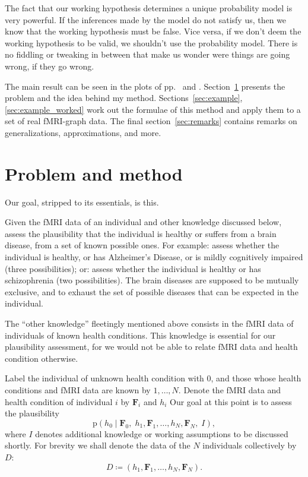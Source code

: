 \documentclass[\ifafour a4paper,12pt,\else a5paper,10pt,\fi%
onecolumn,oneside,article,%
british%
]{memoir}
\theoremstyle{remark}
\theoremstyle{innote}
\newcommand*{\defd}{\coloneqq}
\newcommand*{\pf}{\mathrm{p}}%
\renewcommand*{\|}{\mathpunct{|}}
\newcommand*{\yH}{h}
\newcommand*{\yD}{D}
\newcommand*{\yF}{\bm{F}}
\newcommand*{\yI}{I}
\theoremstyle{plain}
\begin{document}
The fact that our working hypothesis determines a unique probability model
is very powerful. If the inferences made by the model do not satisfy us,
then we know that the working hypothesis must be false. Vice versa, if we
don't deem the working hypothesis to be valid, we shouldn't use the
probability model. There is no fiddling or tweaking in between that make us
wonder were things are going wrong, if they go wrong.


The main result can be seen in the
plots of pp.~\pageref{results_regions} and
\pageref{results_regions_old}. Section~\ref{sec:problem} presents the
problem and the idea behind my method. Sections~\ref{sec:example},
\ref{sec:example_worked} work out the formulae of this method and apply
them to a set of real fMRI-graph data. The final section~\ref{sec:remarks}
contains remarks on generalizations, approximations, and more.

\section{Problem and method}
\label{sec:problem}

Our goal, stripped to its essentials, is this.

Given the fMRI data of an individual and other knowledge discussed below,
assess the plausibility that the individual is healthy or suffers from a
brain disease, from a set of known possible ones. For example: assess
whether the individual is healthy, or has Alzheimer's Disease, or is mildly
cognitively impaired (three possibilities); or: assess whether the
individual is healthy or has schizophrenia (two possibilities). The brain
diseases are supposed to be mutually exclusive, and to exhaust the set of
possible diseases that can be expected in the individual.

The \enquote{other knowledge} fleetingly mentioned above consists in the
fMRI data of individuals of known health conditions. This knowledge is
essential for our plausibility assessment, for we would not be able to
relate fMRI data and health condition otherwise.

Label the individual of unknown health condition with $0$, and those whose
health conditions and fMRI data are known by $1, \dotsc, N$. Denote the
fMRI data and health condition of individual $i$ by $\yF_i$ and $\yH_i$ Our
goal at this point is to assess the plausibility
\begin{equation}
  \label{eq:goal_1st}
  \pf(\yH_0 \| \yF_0,\; \yH_1,\yF_1, \dotsc, \yH_N, \yF_N,\; \yI),
\end{equation}
where $\yI$ denotes additional knowledge or working assumptions to be
discussed shortly. For brevity we shall denote the data of the $N$
individuals collectively by $\yD$:
\begin{equation}
  \label{eq:collective_data_D}
  D \defd (\yH_1,\yF_1, \dotsc, \yH_N, \yF_N).
\end{equation}
\end{document}
